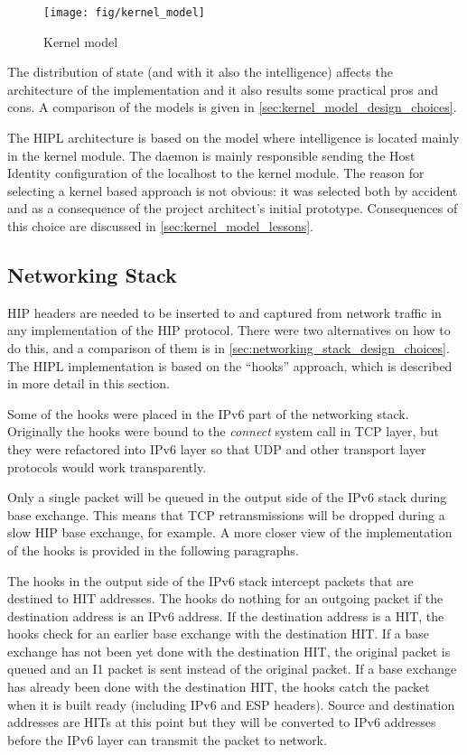 \begin{figure}[hbt]
 \centering
 \texttt{[image: fig/kernel\_model]}
 \caption{Kernel model}
 \label{fig:kernel_model_architecture}
\end{figure}

The distribution of state (and with it also the intelligence) affects
the architecture of the implementation and it also results some
practical pros and cons. A comparison of the models is given in
\autoref{sec:kernel_model_design_choices}.

The HIPL architecture is based on the model where intelligence is
located mainly in the kernel module. The daemon is mainly responsible
sending the Host Identity configuration of the localhost to the kernel
module. The reason for selecting a kernel based approach is not
obvious: it was selected both by accident and as a consequence of the
project architect's initial prototype. Consequences of this choice are
discussed in \autoref{sec:kernel_model_lessons}.

\subsection{Networking Stack}
\label{sec:networking_stack_architecture}

HIP headers are needed to be inserted to and captured from network
traffic in any implementation of the HIP protocol. There were two
alternatives on how to do this, and a comparison of them is in
\autoref{sec:networking_stack_design_choices}. The HIPL implementation
is based on the ``hooks'' approach, which is described in more detail
in this section.

Some of the hooks were placed in the IPv6 part of the networking
stack. Originally the hooks were bound to the \textit{connect} system
call in TCP layer, but they were refactored into IPv6 layer so that
UDP and other transport layer protocols would work transparently.

Only a single packet will be queued in the output side of the IPv6
stack during base exchange. This means that TCP retransmissions will
be dropped during a slow HIP base exchange, for example. A more closer
view of the implementation of the hooks is provided in the following
paragraphs.

The hooks in the output side of the IPv6 stack intercept packets that
are destined to HIT addresses. The hooks do nothing for an outgoing
packet if the destination address is an IPv6 address. If the
destination address is a HIT, the hooks check for an earlier base
exchange with the destination HIT. If a base exchange has not been yet
done with the destination HIT, the original packet is queued and an I1
packet is sent instead of the original packet. If a base exchange has
already been done with the destination HIT, the hooks catch the packet
when it is built ready (including IPv6 and ESP headers). Source and
destination addresses are HITs at this point but they will be
converted to IPv6 addresses before the IPv6 layer can transmit the
packet to network.

